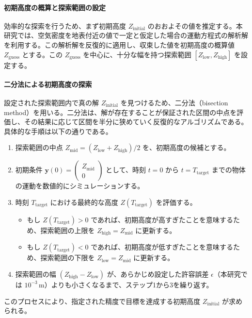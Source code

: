 \documentclass[a4paper,12pt]{article}
\begin{document}
\paragraph{初期高度の概算と探索範囲の設定}
\label{par:initial_guess}
効率的な探索を行うため、まず初期高度 $Z_{\mathrm{initial}}$ のおおよその値を推定する。本研究では、空気密度を地表付近の値で一定と仮定した場合の運動方程式の解析解を利用する。この解析解を反復的に適用し、収束した値を初期高度の概算値 $Z_{\mathrm{guess}}$ とする。この $Z_{\mathrm{guess}}$ を中心に、十分な幅を持つ探索範囲 $[Z_{\mathrm{low}}, Z_{\mathrm{high}}]$ を設定する。

\paragraph{二分法による初期高度の探索}
\label{par:bisection}
設定された探索範囲内で真の解 $Z_{\mathrm{initial}}$ を見つけるため、二分法（bisection method）を用いる。二分法は、解が存在することが保証された区間の中点を評価し、その結果に応じて区間を半分に狭めていく反復的なアルゴリズムである。具体的な手順は以下の通りである。
\begin{enumerate}
    \item 探索範囲の中点 $Z_{\mathrm{mid}} = (Z_{\mathrm{low}} + Z_{\mathrm{high}}) / 2$ を、初期高度の候補とする。
    \item 初期条件 $\bm{y}(0) = \begin{pmatrix} Z_{\mathrm{mid}} \\ 0 \end{pmatrix}$ として、時刻 $t=0$ から $t=T_{\mathrm{target}}$ までの物体の運動を数値的にシミュレーションする。
    \item 時刻 $T_{\mathrm{target}}$ における最終的な高度 $Z(T_{\mathrm{target}})$ を評価する。
    \begin{itemize}
        \item もし $Z(T_{\mathrm{target}}) > 0$ であれば、初期高度が高すぎたことを意味するため、探索範囲の上限を $Z_{\mathrm{high}} = Z_{\mathrm{mid}}$ に更新する。
        \item もし $Z(T_{\mathrm{target}}) < 0$ であれば、初期高度が低すぎたことを意味するため、探索範囲の下限を $Z_{\mathrm{low}} = Z_{\mathrm{mid}}$ に更新する。
    \end{itemize}
    \item 探索範囲の幅 $(Z_{\mathrm{high}} - Z_{\mathrm{low}})$ が、あらかじめ設定した許容誤差 $\epsilon$（本研究では $10^{-3} \, \mathrm{m}$）よりも小さくなるまで、ステップ1から3を繰り返す。
\end{enumerate}
このプロセスにより、指定された精度で目標を達成する初期高度 $Z_{\mathrm{initial}}$ が求められる。
\end{document}
